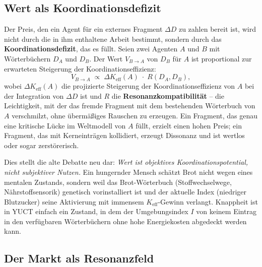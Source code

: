 \documentclass[12pt,a4paper]{article}
\newcommand{\Keff}{K_{\mathrm{eff}}}
\begin{document}
\subsection{Wert als Koordinationsdefizit}

Der Preis, den ein Agent für ein externes Fragment \(\Delta D\) zu zahlen bereit ist, wird nicht durch die in ihm enthaltene Arbeit bestimmt, sondern durch das \textbf{Koordinationsdefizit}, das es füllt. Seien zwei Agenten \(A\) und \(B\) mit Wörterbüchern \(D_A\) und \(D_B\). Der Wert \(V_{B \rightarrow A}\) von \(D_B\) für \(A\) ist proportional zur erwarteten Steigerung der Koordinationseffizienz:
\[
V_{B \rightarrow A} \; \propto \; \Delta\Keff(A) \; \cdot \; R(D_A, D_B),
\]
wobei \(\Delta\Keff(A)\) die projizierte Steigerung der Koordinationseffizienz von \(A\) bei der Integration von \(\Delta D\) ist und \(R\) die \textbf{Resonanzkompatibilität} – die Leichtigkeit, mit der das fremde Fragment mit dem bestehenden Wörterbuch von \(A\) verschmilzt, ohne übermäßiges Rauschen zu erzeugen. Ein Fragment, das genau eine kritische Lücke im Weltmodell von \(A\) füllt, erzielt einen hohen Preis; ein Fragment, das mit Kerneinträgen kollidiert, erzeugt Dissonanz und ist wertlos oder sogar zerstörerisch.

Dies stellt die alte Debatte neu dar: \emph{Wert ist objektives Koordinationspotential, nicht subjektiver Nutzen.} Ein hungernder Mensch schätzt Brot nicht wegen eines mentalen Zustands, sondern weil das Brot-Wörterbuch (Stoffwechselwege, Nährstoffsensorik) genetisch vorinstalliert ist und der aktuelle Index (niedriger Blutzucker) seine Aktivierung mit immensem \(K_{\mathrm{eff}}\)-Gewinn verlangt. Knappheit ist in YUCT einfach ein Zustand, in dem der Umgebungsindex \(I\) von keinem Eintrag in den verfügbaren Wörterbüchern ohne hohe Energiekosten abgedeckt werden kann.

\subsection{Der Markt als Resonanzfeld}
\end{document}

